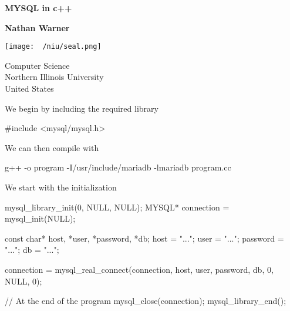 \documentclass{report}
\title{\Huge{}}
\author{\huge{Nathan Warner}}
\date{\huge{}}
\begin{document}
        \begin{titlepage}
       \begin{center}
           \vspace*{1cm}
    
           \textbf{MYSQL in c++}
    
           \vspace{0.5cm}
            
                
           \vspace{1.5cm}
    
           \textbf{Nathan Warner}
    
           \vfill
                
                
           \vspace{0.8cm}
         
           \texttt{[image: ~/niu/seal.png]}
                
           Computer Science \\
           Northern Illinois University\\
           United States\\
           
                
       \end{center}
    \end{titlepage}
    \tableofcontents
    \pagebreak 
    \bigbreak \noindent 
    We begin by including the required library
    \bigbreak \noindent 
    \begin{cppcode}
    #include <mysql/mysql.h>
    \end{cppcode}
    \bigbreak \noindent 
    We can then compile  with
    \begin{cppcode}
    g++ -o program -I/usr/include/mariadb -lmariadb program.cc
    \end{cppcode}


    \pagebreak 
    \bigbreak \noindent 
    We start with the initialization
    \bigbreak \noindent 
    \begin{cppcode}
    mysql_library_init(0, NULL, NULL);
    MYSQL* connection = mysql_init(NULL);

    const char* host, *user, *password, *db;
    host = "...";
    user = "...";
    password = "...";
    db = "...";

    connection = mysql_real_connect(connection, host, user, password, db, 0, NULL, 0);


    // At the end of the program
    mysql_close(connection);
    mysql_library_end();
    \end{cppcode}
\end{document}
